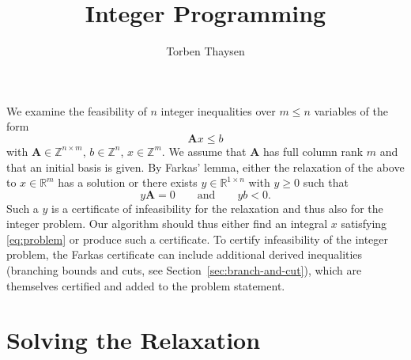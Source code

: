 \documentclass[a4paper, 12pt]{article}
\author{Torben Thaysen}
\title{Integer Programming}
\newcommand{\R} {\mathbb{R}}
\newcommand{\Z} {\mathbb{Z}}
\begin{document}
\maketitle

We examine the feasibility of $n$ integer inequalities over $m \leq n$ variables of the form
\begin{equation}\label{eq:problem}
\bm{A} x \leq b
\end{equation}
with $\bm{A} \in \Z^{n \times m}$, $b \in \Z^n$, $x \in \Z^m$.
We assume that $\bm{A}$ has full column rank $m$ and that an initial basis is given.
By Farkas' lemma, either the relaxation of the above to $x \in \R^m$ has a solution or there exists $y \in \R^{1 \times n}$ with $y \geq 0$ such that
\begin{equation*}
y \bm{A} = 0 \qquad \text{and} \qquad y b < 0.
\end{equation*}
Such a $y$ is a certificate of infeasibility for the relaxation and thus also for the integer problem. Our algorithm should thus either find an integral $x$ satisfying \eqref{eq:problem} or produce such a certificate. To certify infeasibility of the integer problem, the Farkas certificate can include additional derived inequalities (branching bounds and cuts, see Section~\ref{sec:branch-and-cut}), which are themselves certified and added to the problem statement.

\section{Solving the Relaxation}
\end{document}
